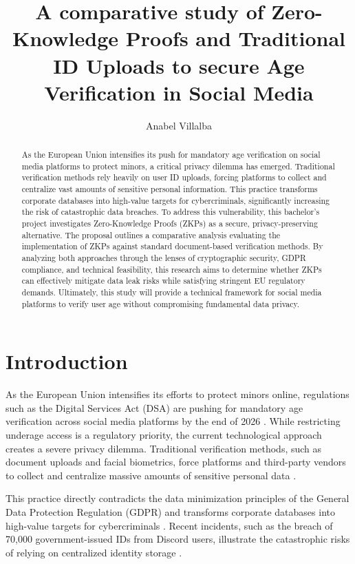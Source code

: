 \documentclass [english]{hogent-article}
\title{A comparative study of Zero-Knowledge Proofs and Traditional ID Uploads to secure Age Verification in Social Media}
\author{Anabel Villalba}
\begin{document}
   
    \begin{abstract}
        
       As the European Union intensifies its push for mandatory age verification on social media platforms to protect minors, a critical privacy dilemma has emerged. Traditional verification methods rely heavily on user ID uploads, forcing platforms to collect and centralize vast amounts of sensitive personal information. This practice transforms corporate databases into high-value targets for cybercriminals, significantly increasing the risk of catastrophic data breaches. To address this vulnerability, this bachelor's project investigates Zero-Knowledge Proofs (ZKPs) as a secure, privacy-preserving alternative. The proposal outlines a comparative analysis evaluating the implementation of ZKPs against standard document-based verification methods. By analyzing both approaches through the lenses of cryptographic security, GDPR compliance, and technical feasibility, this research aims to determine whether ZKPs can effectively mitigate data leak risks while satisfying stringent EU regulatory demands. Ultimately, this study will provide a technical framework for social media platforms to verify user age without compromising fundamental data privacy.
    \end{abstract}
    
    
    
    \tableofcontents
    
    
    
    \section{Introduction}%
    
    \label{sec:introduction}
    
    As the European Union intensifies its efforts to protect minors online, regulations such as the Digital Services Act (DSA) are pushing for mandatory age verification across social media platforms by the end of 2026 \autocite{LewisSilkin2026, EUCommission2025}. While restricting underage access is a regulatory priority, the current technological approach creates a severe privacy dilemma. Traditional verification methods, such as document uploads and facial biometrics, force platforms and third-party vendors to collect and centralize massive amounts of sensitive personal data \autocite{Wodo2025, Alajaji2025}.
    
    
    
    This practice directly contradicts the data minimization principles of the General Data Protection Regulation (GDPR) and transforms corporate databases into high-value targets for cybercriminals \autocite{Newmark2026}. Recent incidents, such as the breach of 70,000 government-issued IDs from Discord users, illustrate the catastrophic risks of relying on centralized identity storage \autocite{Alajaji2025, EFF2025ZKP}.
    
\end{document}
